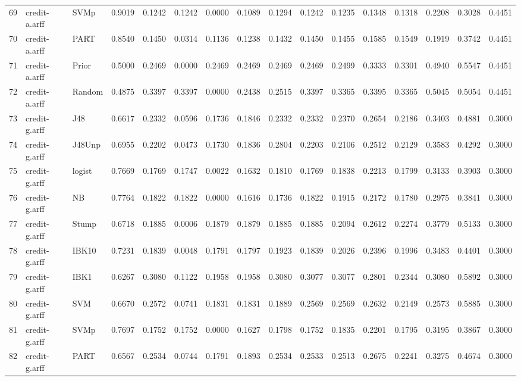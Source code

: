 \documentclass {article}
\begin{document}
\begin{table}[ht]
\begin{tabular}{rllrrrrrrrrrrrrr}
  69 & credit-a.arff & SVMp & 0.9019 & 0.1242 & 0.1242 & 0.0000 & 0.1089 & 0.1294 & 0.1242 & 0.1235 & 0.1348 & 0.1318 & 0.2208 & 0.3028 & 0.4451 \\ 
  70 & credit-a.arff & PART & 0.8540 & 0.1450 & 0.0314 & 0.1136 & 0.1238 & 0.1432 & 0.1450 & 0.1455 & 0.1585 & 0.1549 & 0.1919 & 0.3742 & 0.4451 \\ 
  71 & credit-a.arff & Prior & 0.5000 & 0.2469 & 0.0000 & 0.2469 & 0.2469 & 0.2469 & 0.2469 & 0.2499 & 0.3333 & 0.3301 & 0.4940 & 0.5547 & 0.4451 \\ 
  72 & credit-a.arff & Random & 0.4875 & 0.3397 & 0.3397 & 0.0000 & 0.2438 & 0.2515 & 0.3397 & 0.3365 & 0.3395 & 0.3365 & 0.5045 & 0.5054 & 0.4451 \\ 
  73 & credit-g.arff & J48 & 0.6617 & 0.2332 & 0.0596 & 0.1736 & 0.1846 & 0.2332 & 0.2332 & 0.2370 & 0.2654 & 0.2186 & 0.3403 & 0.4881 & 0.3000 \\ 
  74 & credit-g.arff & J48Unp & 0.6955 & 0.2202 & 0.0473 & 0.1730 & 0.1836 & 0.2804 & 0.2203 & 0.2106 & 0.2512 & 0.2129 & 0.3583 & 0.4292 & 0.3000 \\ 
  75 & credit-g.arff & logist & 0.7669 & 0.1769 & 0.1747 & 0.0022 & 0.1632 & 0.1810 & 0.1769 & 0.1838 & 0.2213 & 0.1799 & 0.3133 & 0.3903 & 0.3000 \\ 
  76 & credit-g.arff & NB & 0.7764 & 0.1822 & 0.1822 & 0.0000 & 0.1616 & 0.1736 & 0.1822 & 0.1915 & 0.2172 & 0.1780 & 0.2975 & 0.3841 & 0.3000 \\ 
  77 & credit-g.arff & Stump & 0.6718 & 0.1885 & 0.0006 & 0.1879 & 0.1879 & 0.1885 & 0.1885 & 0.2094 & 0.2612 & 0.2274 & 0.3779 & 0.5133 & 0.3000 \\ 
  78 & credit-g.arff & IBK10 & 0.7231 & 0.1839 & 0.0048 & 0.1791 & 0.1797 & 0.1923 & 0.1839 & 0.2026 & 0.2396 & 0.1996 & 0.3483 & 0.4401 & 0.3000 \\ 
  79 & credit-g.arff & IBK1 & 0.6267 & 0.3080 & 0.1122 & 0.1958 & 0.1958 & 0.3080 & 0.3077 & 0.3077 & 0.2801 & 0.2344 & 0.3080 & 0.5892 & 0.3000 \\ 
  80 & credit-g.arff & SVM & 0.6670 & 0.2572 & 0.0741 & 0.1831 & 0.1831 & 0.1889 & 0.2569 & 0.2569 & 0.2632 & 0.2149 & 0.2573 & 0.5885 & 0.3000 \\ 
  81 & credit-g.arff & SVMp & 0.7697 & 0.1752 & 0.1752 & 0.0000 & 0.1627 & 0.1798 & 0.1752 & 0.1835 & 0.2201 & 0.1795 & 0.3195 & 0.3867 & 0.3000 \\ 
  82 & credit-g.arff & PART & 0.6567 & 0.2534 & 0.0744 & 0.1791 & 0.1893 & 0.2534 & 0.2533 & 0.2513 & 0.2675 & 0.2241 & 0.3275 & 0.4674 & 0.3000 \\ 

\end{tabular}
\end{table}
\end{document}
